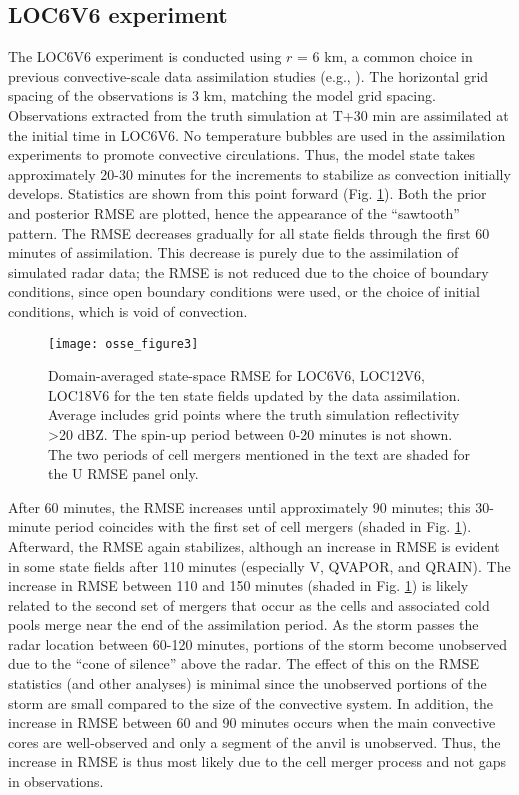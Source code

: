 \subsection{LOC6V6 experiment}
The LOC6V6 experiment is conducted using \(r\) = 6 km, a common choice in previous convective-scale data assimilation studies (e.g., \citealt{dowelletal04,dongetal11}). The horizontal grid spacing of the observations is 3 km, matching the model grid spacing. Observations extracted from the truth simulation at T+30 min are assimilated at the initial time in LOC6V6. No temperature bubbles are used in the assimilation experiments to promote convective circulations. Thus, the model state takes approximately 20-30 minutes for the increments to stabilize as convection initially develops. Statistics are shown from this point forward (Fig. \ref{osse_fig3}). Both the prior and posterior RMSE are plotted, hence the appearance of the “sawtooth” pattern. The RMSE decreases gradually for all state fields through the first 60 minutes of assimilation. This decrease is purely due to the assimilation of simulated radar data; the RMSE is not reduced due to the choice of boundary conditions, since open boundary conditions were used, or the choice of initial conditions, which is void of convection.

\begin{figure}
\centering
\texttt{[image: osse\_figure3]}
\caption{Domain-averaged state-space RMSE for LOC6V6, LOC12V6, LOC18V6 for the ten state fields updated by the data assimilation. Average includes grid points where the truth simulation reflectivity \textgreater 20 dBZ. The spin-up period between 0-20 minutes is not shown. The two periods of cell mergers mentioned in the text are shaded for the U RMSE panel only.}
\label{osse_fig3}
\end{figure}

After 60 minutes, the RMSE increases until approximately 90 minutes; this 30-minute period coincides with the first set of cell mergers (shaded in Fig. \ref{osse_fig3}). Afterward, the RMSE again stabilizes, although an increase in RMSE is evident in some state fields after 110 minutes (especially V, QVAPOR, and QRAIN). The increase in RMSE between 110 and 150 minutes (shaded in Fig. \ref{osse_fig3}) is likely related to the second set of mergers that occur as the cells and associated cold pools merge near the end of the assimilation period. As the storm passes the radar location between 60-120 minutes, portions of the storm become unobserved due to the “cone of silence” above the radar. The effect of this on the RMSE statistics (and other analyses) is minimal since the unobserved portions of the storm are small compared to the size of the convective system. In addition, the increase in RMSE between 60 and 90 minutes occurs when the main convective cores are well-observed and only a segment of the anvil is unobserved. Thus, the increase in RMSE is thus most likely due to the cell merger process and not gaps in observations.


